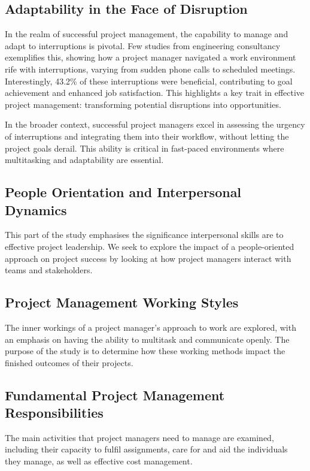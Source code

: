\documentclass{article}
\begin{document}
\subsection{Adaptability in the Face of Disruption}
In the realm of successful project management, the capability to manage and adapt to interruptions is pivotal. Few studies from engineering consultancy exemplifies this, showing how a project manager navigated a work environment rife with interruptions, varying from sudden phone calls to scheduled meetings. Interestingly, 43.2\% of these interruptions were beneficial, contributing to goal achievement and enhanced job satisfaction. This highlights a key trait in effective project management: transforming potential disruptions into opportunities.

In the broader context, successful project managers excel in assessing the urgency of interruptions and integrating them into their workflow, without letting the project goals derail. This ability is critical in fast-paced environments where multitasking and adaptability are essential.

\subsection{People Orientation and Interpersonal Dynamics}
This part of the study emphasises the significance interpersonal skills are to effective project leadership. We seek to explore the impact of a people-oriented approach on project success by looking at how project managers interact with teams and stakeholders.




\subsection{Project Management Working Styles}
The inner workings of a project manager's approach to work are explored, with an emphasis on having the ability to multitask and communicate openly. The purpose of the study is to determine how these working methods impact the finished outcomes of their projects.

\subsection{Fundamental Project Management Responsibilities}
The main activities that project managers need to manage are examined, including their capacity to fulfil assignments, care for and aid the individuals they manage, as well as effective cost management.
\end{document}
